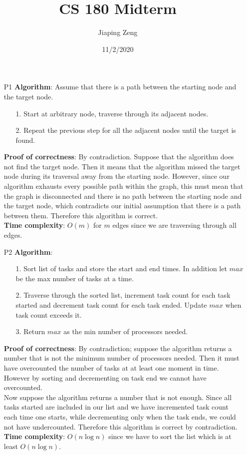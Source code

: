 \documentclass{article}
\title{CS 180 Midterm}
\author{Jiaping Zeng}
\date{11/2/2020}
\begin{document}

\newpage
\maketitle

\newpage
\begin{itemize}
    \item [P1]
          \textbf{Algorithm}: Assume that there is a path between the starting node and the target node.
          \begin{itemize}
              \item [1.] Start at arbitrary node, traverse through its adjacent nodes.
              \item [2.] Repeat the previous step for all the adjacent nodes until the target is found.
          \end{itemize}
          \textbf{Proof of correctness}: By contradiction. Suppose that the algorithm does not find the target node. Then it means that the algorithm missed the target node during its traversal away from the starting node. However, since our algorithm exhausts every possible path within the graph, this must mean that the graph is disconnected and there is no path between the starting node and the target node, which contradicts our initial assumption that there is a path between them. Therefore this algorithm is correct.\\
          \textbf{Time complexity}: $O(m)$ for $m$ edges since we are traversing through all edges.
\end{itemize}

\newpage
\begin{itemize}
    \item [P2]
          \textbf{Algorithm}:
          \begin{itemize}
              \item [1.] Sort list of tasks and store the start and end times. In addition let $max$ be the max number of tasks at a time.
              \item [2.] Traverse through the sorted list, increment task count for each task started and decrement task count for each task ended. Update $max$ when task count exceeds it.
              \item [3.] Return $max$ as the min number of processors needed.
          \end{itemize}
          \textbf{Proof of correctness}: By contradiction; suppose the algorithm returns a number that is not the minimum number of processors needed. Then it must have overcounted the number of tasks at at least one moment in time. However by sorting  and decrementing on task end we cannot have overcounted.\\
          Now suppose the algorithm returns a number that is not enough. Since all tasks started are included in our list and we have incremented task count each time one starts, while decrementing only when the task ends, we could not have undercounted. Therefore this algorithm is correct by contradiction.
          \textbf{Time complexity}: $O(n\log n)$ since we have to sort the list which is at least $O(n\log n)$.
\end{itemize}
\end{document}
